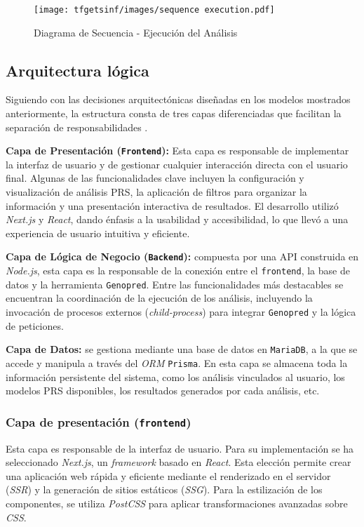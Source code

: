\begin{figure}[H]
    \centering
    \texttt{[image: tfgetsinf/images/sequence execution.pdf]}
    \caption{Diagrama de Secuencia - Ejecución del Análisis}
    \label{fig:exec}
\end{figure}


\subsection{Arquitectura lógica}

Siguiendo con las decisiones arquitectónicas diseñadas en los modelos mostrados anteriormente, la estructura consta de tres capas diferenciadas que facilitan la separación de responsabilidades \cite{fowler}.

\textbf{Capa de Presentación (\texttt{Frontend}):}
Esta capa es responsable de implementar la interfaz de usuario y de gestionar cualquier interacción directa con el usuario final. Algunas de las funcionalidades clave incluyen la configuración y visualización de análisis PRS, la aplicación de filtros para organizar la información y una presentación interactiva de resultados. El desarrollo utilizó \textit{Next.js} y \textit{React}, dando énfasis a la usabilidad y accesibilidad, lo que llevó a una experiencia de usuario intuitiva y eficiente.

\textbf{Capa de Lógica de Negocio (\texttt{Backend}):} compuesta por una API construida en \textit{Node.js}, esta capa es la responsable de la conexión entre el \texttt{frontend}, la base de datos y la herramienta \texttt{Genopred}. Entre las funcionalidades más destacables se encuentran la coordinación de la ejecución de los análisis, incluyendo la invocación de procesos externos (\textit{child-process}) para integrar \texttt{Genopred} y la lógica de peticiones.

\textbf{Capa de Datos:} se gestiona mediante una base de datos en \texttt{MariaDB}, a la que se accede y manipula a través del \textit{ORM} \texttt{Prisma}. En esta capa se almacena toda la información persistente del sistema, como los análisis vinculados al usuario, los modelos PRS disponibles, los resultados generados por cada análisis, etc.


\subsubsection{Capa de presentación (\texttt{frontend})}
Esta capa es responsable de la interfaz de usuario. Para su implementación se ha seleccionado \textit{Next.js}, un \textit{framework} basado en \textit{React}. Esta elección permite crear una aplicación web rápida y eficiente mediante el renderizado en el servidor (\textit{SSR}) y la generación de sitios estáticos (\textit{SSG}). Para la estilización de los componentes, se utiliza \textit{PostCSS} para aplicar transformaciones avanzadas sobre \textit{CSS}.

